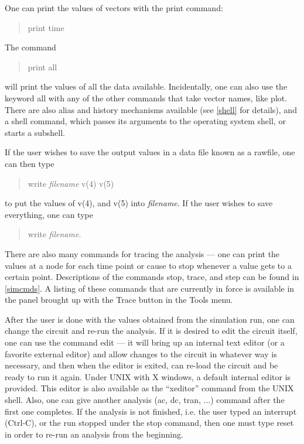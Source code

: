 One can print the values of vectors with the {\cb print} command:
\begin{quote}\vt
print time
\end{quote}
The command
\begin{quote}\vt
print all
\end{quote}
will print the values of all the data available.  Incidentally, one
can also use the keyword {\vt all} with any of the other commands that
take vector names, like {\cb plot}.  There are also alias and history
mechanisms available (see \ref{shell} for details), and a {\cb shell}
command, which passes its arguments to the operating system shell, or
starts a subshell.

If the user wishes to save the output values in a data file known as a
rawfile, one can then type
\begin{quote}\vt
write {\it filename} v(4) v(5)
\end{quote}
to put the values of {\vt v(4)}, and {\vt v(5)} into {\it
filename\/}.  If the user wishes to save everything, one can type
\begin{quote}\vt
write {\it filename}.
\end{quote}

There are also many commands for tracing the analysis --- one can
print the values at a node for each time point or cause {\WRspice} to
stop whenever a value gets to a certain point.  Descriptions of the
commands {\cb stop}, {\cb trace}, and {\cb step} can be found in
\ref{simcmds}.  A listing of these commands that are currently in
force is available in the panel brought up with the {\cb Trace} button
in the {\cb Tools} menu.

After the user is done with the values obtained from the simulation
run, one can change the circuit and re-run the analysis.  If it is
desired to edit the circuit itself, one can use the command {\cb edit}
--- it will bring up an internal text editor (or a favorite external
editor) and allow changes to the circuit in whatever way is necessary,
and then when the editor is exited, {\WRspice} can re-load the circuit
and be ready to run it again.  Under UNIX with X windows, a default
internal editor is provided.  This editor is also available as the
``{\vt xeditor}'' command from the UNIX shell.  Also, one can give
another analysis ({\cb ac}, {\cb dc}, {\cb tran}, ...) command after
the first one completes.  If the analysis is not finished, i.e.  the
user typed an interrupt ({\kb Ctrl-C}), or the run stopped under the
{\cb stop} command, then one must type {\cb reset} in order to re-run
an analysis from the beginning.

